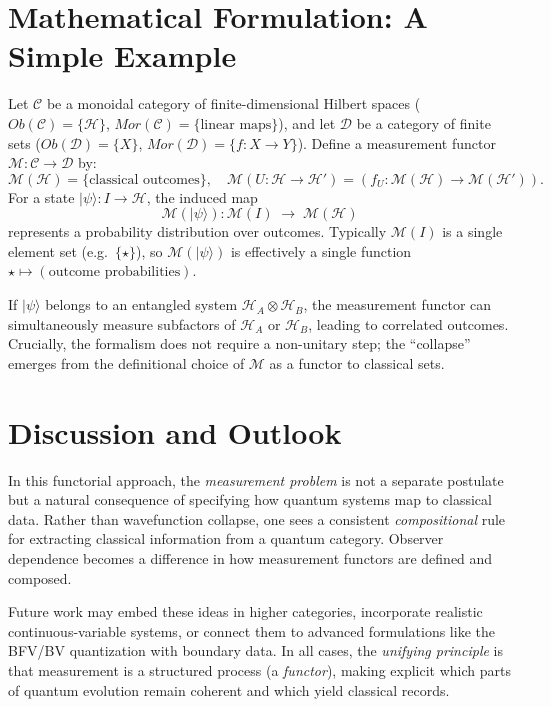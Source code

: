 \documentclass[12pt]{article}
\begin{document}
\section{Mathematical Formulation: A Simple Example}
\label{sec:mathFormulation}

Let \(\mathcal{C}\) be a monoidal category of finite-dimensional Hilbert spaces (\(Ob(\mathcal{C}) = \{ \mathcal{H} \}\), 
\(Mor(\mathcal{C}) = \{ \text{linear maps}\}\)), and let \(\mathcal{D}\) be a category of finite sets 
(\(Ob(\mathcal{D}) = \{ X \}\), \(Mor(\mathcal{D}) = \{ f: X \to Y \}\)). 
Define a measurement functor \(\mathcal{M}: \mathcal{C} \to \mathcal{D}\) by:
\[
\mathcal{M}(\mathcal{H}) = \{\text{classical outcomes}\}, 
\quad \mathcal{M}(U: \mathcal{H} \to \mathcal{H}') 
= (f_U : \mathcal{M}(\mathcal{H}) \to \mathcal{M}(\mathcal{H}')).
\]
For a state \(\vert \psi \rangle: I \to \mathcal{H}\), the induced map
\[
\mathcal{M}(\vert \psi \rangle) : \mathcal{M}(I) \;\to\; \mathcal{M}(\mathcal{H})
\]
represents a probability distribution over outcomes. Typically \(\mathcal{M}(I)\) is a single element set 
(e.g.\ \(\{\star\}\)), so \(\mathcal{M}(\vert \psi \rangle)\) is effectively a single function \(\star \mapsto (\text{outcome probabilities})\).

If \(\vert \psi \rangle\) belongs to an entangled system \(\mathcal{H}_A \otimes \mathcal{H}_B\), 
the measurement functor can simultaneously measure subfactors of \(\mathcal{H}_A\) or \(\mathcal{H}_B\), 
leading to correlated outcomes. Crucially, the formalism does not require a non-unitary step; 
the “collapse” emerges from the definitional choice of \(\mathcal{M}\) as a functor to classical sets.

\vspace{1em}

\section{Discussion and Outlook}
In this functorial approach, the \emph{measurement problem} is not a separate postulate but a natural consequence of specifying 
how quantum systems map to classical data. Rather than wavefunction collapse, one sees a consistent \emph{compositional} rule 
for extracting classical information from a quantum category. Observer dependence becomes a difference in how measurement 
functors are defined and composed. 

Future work may embed these ideas in higher categories, incorporate realistic continuous-variable systems, 
or connect them to advanced formulations like the BFV/BV quantization with boundary data. In all cases, 
the \emph{unifying principle} is that measurement is a structured process (a \emph{functor}), 
making explicit which parts of quantum evolution remain coherent and which yield classical records.
\end{document}
